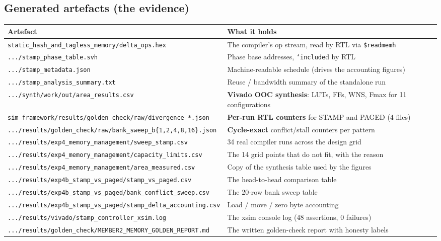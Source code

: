 \documentclass[11pt,a4paper]{article}
\newcommand{\file}[1]{\texttt{\small #1}}
\begin{document}
\subsection{Generated artefacts (the evidence)}

\begin{center}
\small
\begin{longtable}{@{}p{8.0cm}p{7.6cm}@{}}
\toprule
\textbf{Artefact} & \textbf{What it holds} \\
\midrule
\endhead
\file{static\_hash\_and\_tagless\_memory/delta\_ops.hex} & The compiler's op stream, read by RTL via \file{\$readmemh} \\
\file{.../stamp\_phase\_table.svh} & Phase base addresses, \file{`include}d by RTL \\
\file{.../stamp\_metadata.json} & Machine-readable schedule (drives the accounting figures) \\
\file{.../stamp\_analysis\_summary.txt} & Reuse / bandwidth summary of the standalone run \\
\file{.../synth/work/out/area\_results.csv} & \textbf{Vivado OOC synthesis}: LUTs, FFs, WNS, Fmax for 11 configurations \\
\file{sim\_framework/results/golden\_check/raw/divergence\_*.json} & \textbf{Per-run RTL counters} for STAMP and PAGED (4 files) \\
\file{.../results/golden\_check/raw/bank\_sweep\_b\{1,2,4,8,16\}.json} & \textbf{Cycle-exact} conflict/stall counters per pattern \\
\file{.../results/exp4\_memory\_management/sweep\_stamp.csv} & 34 real compiler runs across the design grid \\
\file{.../results/exp4\_memory\_management/capacity\_limits.csv} & The 14 grid points that do not fit, with the reason \\
\file{.../results/exp4\_memory\_management/area\_measured.csv} & Copy of the synthesis table used by the figures \\
\file{.../results/exp4b\_stamp\_vs\_paged/stamp\_vs\_paged.csv} & The head-to-head comparison table \\
\file{.../results/exp4b\_stamp\_vs\_paged/bank\_conflict\_sweep.csv} & The 20-row bank sweep table \\
\file{.../results/exp4b\_stamp\_vs\_paged/stamp\_delta\_accounting.csv} & Load / move / zero byte accounting \\
\file{.../results/vivado/stamp\_controller\_xsim.log} & The xsim console log (48 assertions, 0 failures) \\
\file{.../results/golden\_check/MEMBER2\_MEMORY\_GOLDEN\_REPORT.md} & The written golden-check report with honesty labels \\
\bottomrule
\end{longtable}
\end{center}
\end{document}
